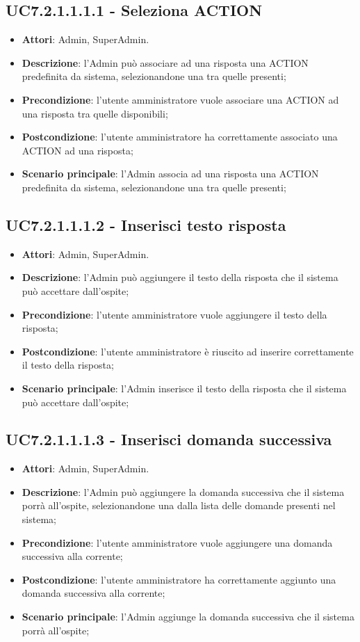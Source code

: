 \documentclass[../AnalisiDeiRequisiti_v3.0.0.tex]{subfiles}
\begin{document}
\begin{itemize}
\subsection{UC7.2.1.1.1.1 - Seleziona ACTION} 
\label{sssec:UC7.2.1.1.1.1} 
\begin{itemize} 
\item \textbf{Attori}: Admin, SuperAdmin.
\item \textbf{Descrizione}: l'Admin può associare ad una risposta una ACTION predefinita da sistema, selezionandone una tra quelle presenti;
\item \textbf{Precondizione}: l'utente amministratore vuole associare una ACTION ad una risposta tra quelle disponibili;
\item \textbf{Postcondizione}: l'utente amministratore ha correttamente associato una ACTION ad una risposta;\item \textbf{Scenario principale}: l'Admin associa ad una risposta una ACTION predefinita da sistema, selezionandone una tra quelle presenti;
\end{itemize} 
\subsection{UC7.2.1.1.1.2 - Inserisci testo risposta} 
\label{sssec:UC7.2.1.1.1.2} 
\begin{itemize} 
\item \textbf{Attori}: Admin, SuperAdmin.
\item \textbf{Descrizione}: l'Admin può aggiungere il testo della risposta che il sistema può accettare dall'ospite;
\item \textbf{Precondizione}: l'utente amministratore vuole aggiungere il testo della risposta;
\item \textbf{Postcondizione}: l'utente amministratore è riuscito ad inserire correttamente il testo della risposta;
\item \textbf{Scenario principale}: l'Admin inserisce il testo della risposta che il sistema può accettare dall'ospite;
\end{itemize} 
\subsection{UC7.2.1.1.1.3 - Inserisci domanda successiva} 
\label{sssec:UC7.2.1.1.1.2} 
\begin{itemize} 
\item \textbf{Attori}: Admin, SuperAdmin.
\item \textbf{Descrizione}: l'Admin può aggiungere la domanda successiva che il sistema porrà all'ospite, selezionandone una dalla lista delle domande presenti nel sistema;
\item \textbf{Precondizione}: l'utente amministratore vuole aggiungere una domanda successiva alla corrente;
\item \textbf{Postcondizione}: l'utente amministratore ha correttamente aggiunto una domanda successiva alla corrente;
\item \textbf{Scenario principale}: l'Admin aggiunge la domanda successiva che il sistema porrà all'ospite;
\end{itemize} 
\newpage

\end{itemize}
\end{document}
